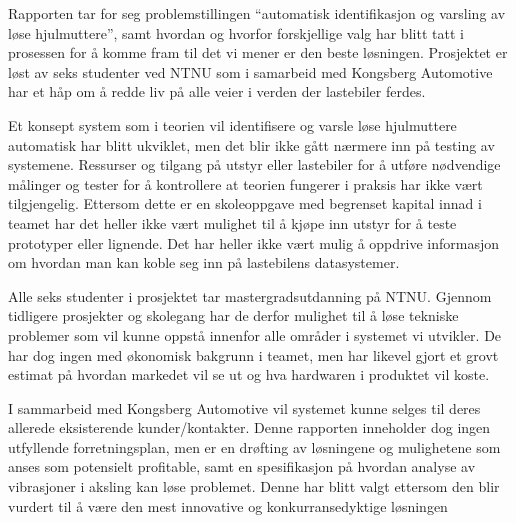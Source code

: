 Rapporten tar for seg problemstillingen ``automatisk identifikasjon og varsling av løse hjulmuttere'', samt hvordan og hvorfor forskjellige
valg har blitt tatt i prosessen for å komme fram til det vi mener er den beste løsningen. Prosjektet er løst av seks studenter ved NTNU
som i samarbeid med Kongsberg Automotive har et håp om å redde liv på alle veier i verden der lastebiler ferdes. 

Et konsept system som i teorien vil identifisere og varsle løse hjulmuttere automatisk har blitt ukviklet, men det blir ikke
gått nærmere inn på testing av systemene. Ressurser og tilgang på utstyr eller lastebiler for å utføre 
nødvendige målinger og tester for å kontrollere at teorien fungerer i praksis har ikke vært tilgjengelig. Ettersom dette er en skoleoppgave med begrenset
kapital innad i teamet har det heller ikke vært mulighet til å kjøpe inn utstyr for å teste prototyper eller lignende. Det har heller ikke 
vært mulig å oppdrive informasjon om hvordan man kan koble seg inn på lastebilens datasystemer.

Alle seks studenter i prosjektet tar mastergradsutdanning på NTNU. Gjennom tidligere prosjekter og skolegang har de derfor
mulighet til å løse tekniske problemer som vil kunne oppstå innenfor alle områder i systemet vi utvikler. De har dog ingen med
økonomisk bakgrunn i teamet, men har likevel gjort et grovt estimat på hvordan markedet vil se ut og hva hardwaren i produktet
vil koste.

I sammarbeid med Kongsberg Automotive vil systemet kunne selges til deres allerede eksisterende kunder/kontakter. Denne rapporten
inneholder dog ingen utfyllende forretningsplan, men er en drøfting av løsningene og mulighetene som anses som
potensielt profitable, samt en spesifikasjon på hvordan analyse av vibrasjoner i aksling kan løse problemet. Denne har blitt valgt ettersom den blir vurdert
til å være den mest innovative og konkurransedyktige løsningen

